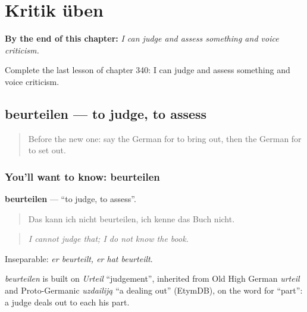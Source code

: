 
\chapter{Kritik üben}
\label{ch:ge-kritik-uben}

\begin{chapteropening}
\textbf{By the end of this chapter:} \emph{I can judge and assess something and voice criticism.}

Complete the last lesson of chapter 340: I can judge and assess something and voice criticism.
\end{chapteropening}

\section[beurteilen]{beurteilen — to judge, to assess}

\label{lesson:GE-C340-beurteilen}



\begin{quote}
Before the new one: say the German for to bring out, then the German for to set out.
\end{quote}

\subsection*{You'll want to know: beurteilen}
\textbf{beurteilen} — \textquotedblleft{}to judge, to assess\textquotedblright{}.

\begin{quote}
Das kann ich nicht beurteilen, ich kenne das Buch nicht.
\end{quote}

\begin{quote}
\emph{I cannot judge that; I do not know the book.}
\end{quote}

Inseparable: \emph{er beurteilt, er hat beurteilt}.

\begin{cousinweb}
\emph{beurteilen} is built on \emph{Urteil} \textquotedblleft{}judgement\textquotedblright{}, inherited from Old High German \emph{urteil} and Proto-Germanic \emph{uzdailiją} \textquotedblleft{}a dealing out\textquotedblright{} (EtymDB), on the word for \textquotedblleft{}part\textquotedblright{}: a judge deals out to each his part.
\end{cousinweb}

